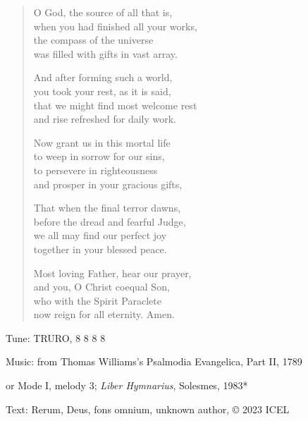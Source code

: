 \hymn

\begin{verse}
O God, the source of all that is,\\
when you had finished all your works,\\
the compass of the universe\\
was filled with gifts in vast array.

And after forming such a world,\\
you took your rest, as it is said,\\
that we might find most welcome rest\\
and rise refreshed for daily work.

Now grant us in this mortal life\\
to weep in sorrow for our sins,\\
to persevere in righteousness\\
and prosper in your gracious gifts,

That when the final terror dawns,\\
before the dread and fearful Judge,\\
we all may find our perfect joy\\
together in your blessed peace.

Most loving Father, hear our prayer,\\
and you, O Christ coequal Son,\\
who with the Spirit Paraclete\\
now reign for all eternity. Amen.
\end{verse}

\begin{hymnsource}
Tune: TRURO, 8 8 8 8

Music: from Thomas Williams’s Psalmodia Evangelica, Part II, 1789

or Mode I, melody 3; \emph{Liber Hymnarius}, Solesmes, 1983*

Text: Rerum, Deus, fons omnium, unknown author, © 2023 ICEL
\end{hymnsource}